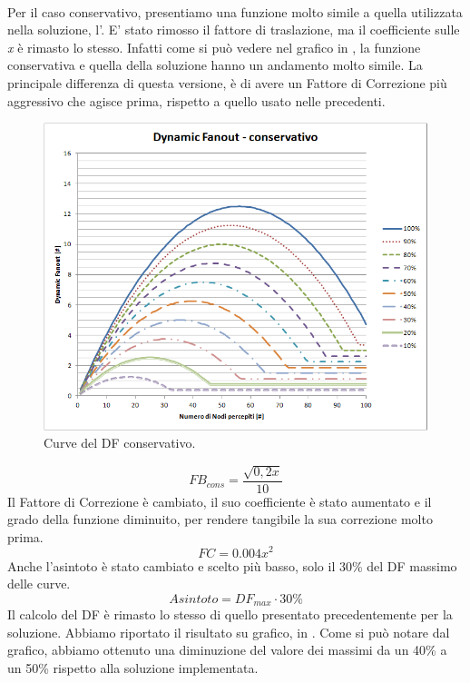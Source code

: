 \\
Per il caso conservativo, presentiamo una funzione molto simile a quella utilizzata nella soluzione, l'. E' stato rimosso il fattore di traslazione, ma il coefficiente sulle \textit{x} è rimasto lo stesso. Infatti come si può vedere nel grafico in , la funzione conservativa e quella della soluzione hanno un andamento molto simile. La principale differenza di questa versione, è di avere un Fattore di Correzione più aggressivo che agisce prima, rispetto a quello usato nelle precedenti.
\begin{figure}[t]
	\centering
	\includegraphics[width=0.9\linewidth]{Images/grafici_usati/DF_conservativo_tot_no_arr}
	\caption[Curve del DF conservativo]{Curve del DF conservativo.}
	\label{fig:DF_conservativo_tot_no_arr}
\end{figure}
\begin{equation}
	FB_{cons}=\dfrac{\sqrt{0,2x}}{10}\nonumber
\end{equation}
Il Fattore di Correzione è cambiato, il suo coefficiente è stato aumentato e il grado della funzione diminuito, per rendere tangibile la sua correzione molto prima.
\begin{equation}
	FC = 0.004x^2
\end{equation}
Anche l'asintoto è stato cambiato e scelto più basso, solo il 30\% del DF massimo delle curve.
\begin{equation}
	Asintoto = DF_{max}\cdot 30\%
\end{equation}
Il calcolo del DF è rimasto lo stesso di quello presentato precedentemente per la soluzione. Abbiamo riportato il risultato su grafico, in . Come si può notare dal grafico, abbiamo ottenuto una diminuzione del valore dei massimi da un 40\% a un 50\% rispetto alla soluzione implementata.
\bigskip

